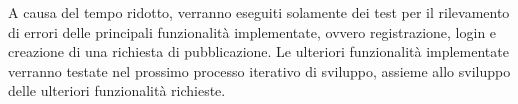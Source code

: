 A causa del tempo ridotto, verranno eseguiti solamente dei test per il rilevamento di errori delle principali funzionalità implementate, ovvero registrazione, login e creazione di una richiesta di pubblicazione. Le ulteriori funzionalità implementate verranno testate nel prossimo processo iterativo di sviluppo, assieme allo sviluppo delle ulteriori funzionalità richieste.